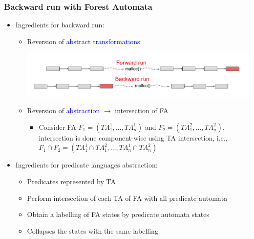 \documentclass{beamer}
\newcommand{\hlbl}[1]{\textcolor{blue}{#1}}
\newcommand{\hlgr}[1]{\textcolor{olive!50!green}{#1}}
\begin{document}
\begin{frame}
\frametitle{Backward run with Forest Automata}
		\begin{itemize}
		\item \hlgr{Ingredients for backward run}:
		\begin{itemize}
			\item Reversion of \hlbl{abstract transformations}
			\begin{center}
				\includegraphics[scale=0.4]{ex/at.pdf}
			\end{center}
			\pause
			\item Reversion of \hlbl{abstraction} $\rightarrow$ \hlgr{intersection} of FA
			\begin{itemize}
				\item Consider FA $F_1=(TA_1^1,\ldots,TA_n^1)$ and $F_2=(TA_1^2,\ldots,TA_n^2)$,
					intersection is done \hlgr{component-wise} using TA intersection, i.e.,
					$F_1 \cap F_2 = (TA_1^1 \cap TA_1^2,\ldots,TA_n^1 \cap TA_n^2)$
			\end{itemize}
		\end{itemize}
		\pause
		\item \hlgr{Ingredients for predicate languages abstraction}:
		\begin{itemize}
			\item Predicates represented by TA
			\item Perform intersection of each TA of FA with all predicate automata
			\item Obtain a labelling of FA states by predicate automata states
			\item Collapses the states with the same labelling
		\end{itemize}
	\end{itemize}

\end{frame}

\end{document}
